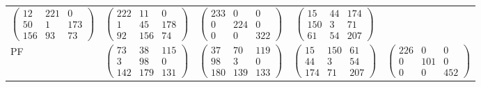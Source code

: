 \begin{tabular}{p{0.5cm}cccc}
 $\begin{pmatrix}
      12  &     221  &       0 \\
      50  &       1  &     173 \\
     156  &      93  &      73 
\end{pmatrix}$
 & 
 $\begin{pmatrix}
     222  &      11  &       0 \\
       1  &      45  &     178 \\
      92  &     156  &      74 
\end{pmatrix}$
 & 
 $\begin{pmatrix}
     233  &       0  &       0 \\
       0  &     224  &       0 \\
       0  &       0  &     322 
\end{pmatrix}$
 & 
 $\begin{pmatrix}
      15  &      44  &     174 \\
     150  &       3  &      71 \\
      61  &      54  &     207 
\end{pmatrix}$
\\ 
PF & 
 $\begin{pmatrix}
      73  &      38  &     115 \\
       3  &      98  &       0 \\
     142  &     179  &     131 
\end{pmatrix}$
 & 
 $\begin{pmatrix}
      37  &      70  &     119 \\
      98  &       3  &       0 \\
     180  &     139  &     133 
\end{pmatrix}$
 & 
 $\begin{pmatrix}
      15  &     150  &      61 \\
      44  &       3  &      54 \\
     174  &      71  &     207 
\end{pmatrix}$
 & 
 $\begin{pmatrix}
     226  &       0  &       0 \\
       0  &     101  &       0 \\
       0  &       0  &     452 
\end{pmatrix}$
\\ 
\end{tabular}
